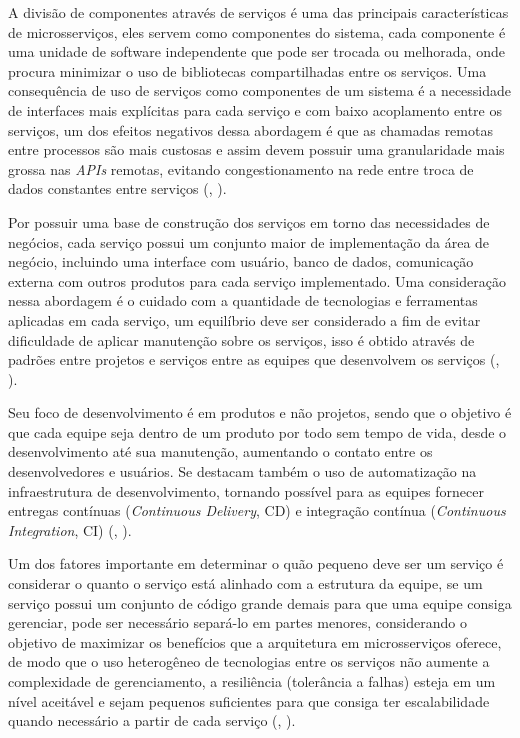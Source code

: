 \documentclass[]{politex}
\begin{document}
A divisão de componentes através de serviços é uma das principais características de microsserviços, eles servem como componentes do sistema, cada componente é uma unidade de software independente que pode ser trocada ou melhorada, onde procura minimizar o uso de bibliotecas compartilhadas entre os serviços. Uma consequência de uso de serviços como componentes de um sistema é a necessidade de interfaces mais explícitas para cada serviço e com baixo acoplamento entre os serviços, um dos efeitos negativos dessa abordagem é que as chamadas remotas entre processos são mais custosas e assim devem possuir uma granularidade mais grossa nas \textit{APIs} remotas, evitando congestionamento na rede entre troca de dados constantes entre serviços (, \citeyear{martinfowler2014microservices}).

Por possuir uma base de construção dos serviços em torno das necessidades de negócios, cada serviço possui um conjunto maior de implementação da área de negócio, incluindo uma interface com usuário, banco de dados, comunicação externa com outros produtos para cada serviço implementado. Uma consideração nessa abordagem é o cuidado com a quantidade de tecnologias e ferramentas aplicadas em cada serviço, um equilíbrio deve ser considerado a fim de evitar dificuldade de aplicar manutenção sobre os serviços, isso é obtido através de padrões entre projetos e serviços entre as equipes que desenvolvem os serviços (, \citeyear{martinfowler2014microservices}).

Seu foco de desenvolvimento é em produtos e não projetos, sendo que o objetivo é que cada equipe seja dentro de um produto por todo sem tempo de vida, desde o desenvolvimento até sua manutenção, aumentando o contato entre os desenvolvedores e usuários. Se destacam também o uso de automatização na infraestrutura de desenvolvimento, tornando possível para as equipes fornecer entregas contínuas (\textit{Continuous Delivery}, CD) e integração contínua (\textit{Continuous Integration}, CI) (, \citeyear{martinfowler2014microservices}).

Um dos fatores importante em determinar o quão pequeno deve ser um serviço é considerar o quanto o serviço está alinhado com a estrutura da equipe, se um serviço possui um conjunto de código grande demais para que uma equipe consiga gerenciar, pode ser necessário separá-lo em partes menores, considerando o objetivo de maximizar os benefícios que a arquitetura em microsserviços oferece, de modo que o uso heterogêneo de tecnologias entre os serviços não aumente a complexidade de gerenciamento, a resiliência (tolerância a falhas) esteja em um nível aceitável e sejam pequenos suficientes para que consiga ter escalabilidade quando necessário a partir de cada serviço (, \citeyear{Newman}).
\end{document}
